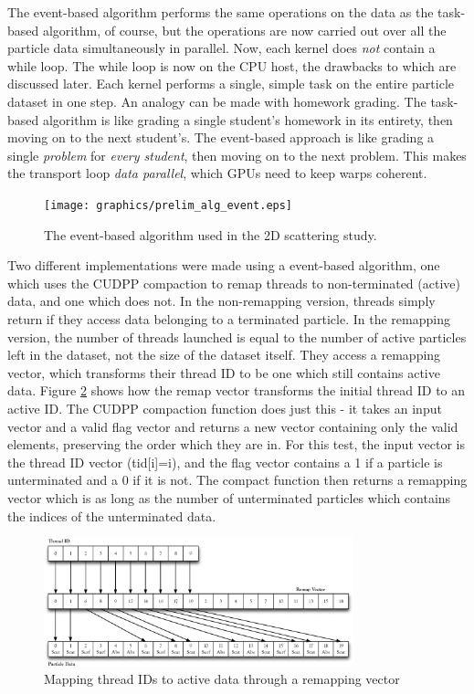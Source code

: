 The event-based algorithm performs the same operations on the data as the task-based algorithm, of course, but the operations are now carried out over all the particle data simultaneously in parallel.  Now, each kernel does \emph{not} contain a while loop.  The while loop is now on the CPU host, the drawbacks to which are discussed later.  Each kernel performs a single, simple task on the entire particle dataset in one step.  An analogy can be made with homework grading.  The task-based algorithm is like grading a single student's homework in its entirety, then moving on to the next student's.  The event-based approach is like grading a single \emph{problem} for \emph{every student}, then moving on to the next problem.  This makes the transport loop \emph{data parallel}, which GPUs need to keep warps coherent. 

\begin{figure}[h!] 
  \centering
    \texttt{[image: graphics/prelim\_alg\_event.eps]}
     \caption{The event-based algorithm used in the 2D scattering study. \label{prelim_alg_event} }
\end{figure}

Two different implementations were made using a event-based algorithm, one which uses the CUDPP compaction to remap threads to non-terminated (active) data, and one which does not.  In the non-remapping version, threads simply return if they access data belonging to a terminated particle.  In the remapping version, the number of threads launched is equal to the number of active particles left in the dataset, not the size of the dataset itself.  They access a remapping vector, which transforms their thread ID to be one which still contains active data.  Figure \ref{remapping} shows how the remap vector transforms the initial thread ID to an active ID.  The CUDPP compaction function does just this - it takes an input vector and a valid flag vector and returns a new vector containing only the valid elements, preserving the order which they are in.  For this test, the input vector is the thread ID vector (tid[i]=i), and the flag vector contains a 1 if a particle is unterminated and a 0 if it is not.  The compact function then returns a remapping vector which is as long as the number of unterminated particles which contains the indices of the unterminated data.

\begin{figure}[h!] 
  \centering
    \includegraphics[width=0.8\textwidth]{graphics/remapping_horiz.eps}
     \caption{Mapping thread IDs to active data through a remapping vector \label{remapping} }
\end{figure}

